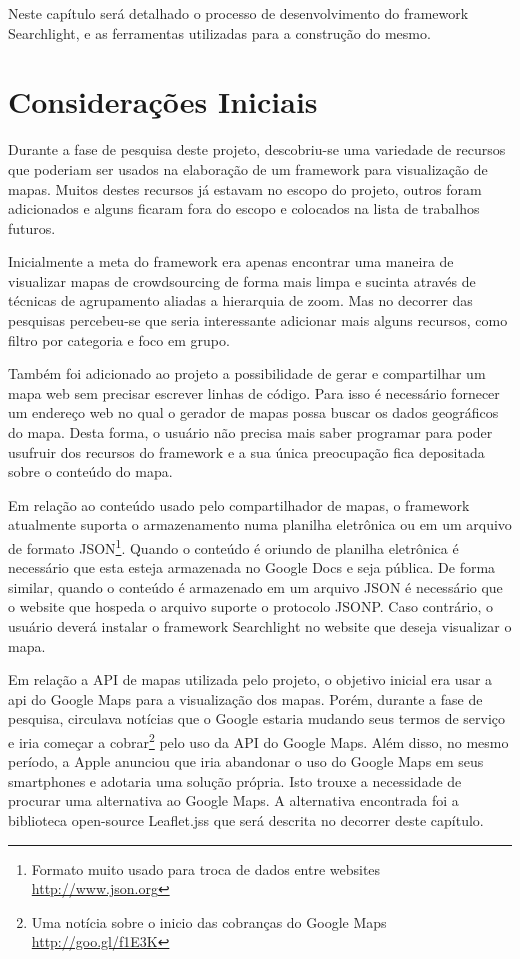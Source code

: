 Neste capítulo será detalhado o processo de desenvolvimento do framework Searchlight, e as ferramentas utilizadas para a construção do mesmo.

\section{Considerações Iniciais}
Durante  a fase de pesquisa deste projeto, descobriu-se uma variedade de recursos que poderiam ser usados na elaboração de um framework para visualização de mapas. Muitos destes recursos já estavam no escopo do projeto, outros foram adicionados  e alguns ficaram fora do escopo e colocados na lista de trabalhos futuros.

Inicialmente a meta do framework era apenas encontrar uma maneira de visualizar mapas de crowdsourcing de forma mais limpa e sucinta através de técnicas de agrupamento aliadas a hierarquia de zoom. Mas no decorrer das pesquisas percebeu-se que seria interessante adicionar mais alguns recursos, como filtro por categoria e foco em grupo. 

Também foi adicionado ao projeto a possibilidade de gerar e compartilhar um mapa web sem precisar escrever linhas de código.
Para isso é necessário fornecer um endereço web no qual o gerador de mapas possa buscar os dados geográficos do mapa. Desta forma, o usuário não precisa mais saber programar para poder usufruir dos recursos do framework e a sua única preocupação fica depositada sobre o conteúdo do mapa.

Em relação ao conteúdo usado pelo compartilhador de mapas, o framework atualmente suporta o armazenamento numa planilha eletrônica ou em um arquivo de formato JSON\footnote{Formato muito usado para troca de dados entre websites \url{http://www.json.org}}. Quando o conteúdo é oriundo de planilha eletrônica é necessário que esta esteja armazenada no Google Docs e seja pública. De forma similar, quando o conteúdo é armazenado em um arquivo JSON é necessário que o website que hospeda o arquivo suporte o protocolo JSONP. Caso contrário, o usuário deverá instalar o framework Searchlight no website que deseja visualizar o mapa.


Em relação a API de mapas utilizada pelo projeto, o objetivo inicial era usar a api do Google Maps para a visualização dos mapas. Porém,  durante a fase de pesquisa, circulava notícias que o Google estaria mudando seus termos de serviço e iria começar a cobrar\footnote{Uma notícia sobre o inicio das cobranças do Google Maps \url{http://goo.gl/f1E3K}} pelo uso da API do Google Maps. Além disso, no mesmo período, a Apple anunciou que iria abandonar o uso do Google Maps em seus smartphones e adotaria uma solução própria. Isto trouxe a necessidade de procurar uma alternativa ao Google Maps. A alternativa encontrada foi a biblioteca open-source Leaflet.jss \cite{leaflet} que será descrita no decorrer deste capítulo.

